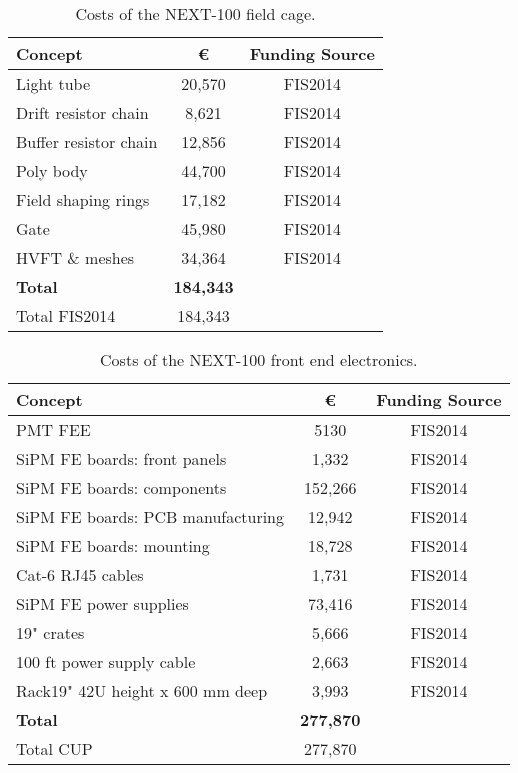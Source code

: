 \begin{table}[h!]
\begin{center}
\begin{tabular}{|l|c|c|}
\hline
 Concept & \euro & Funding Source \\
 \hline
 Light tube & 20,570 & FIS2014 \\
 Drift resistor chain & 8,621 & FIS2014 \\
 Buffer resistor chain & 12,856 & FIS2014\\
 Poly body & 44,700 & FIS2014 \\
 Field shaping rings & 17,182 & FIS2014 \\
 Gate &45,980 & FIS2014 \\
 HVFT \& meshes & 34,364 & FIS2014 \\
  \hline
{\bf Total} &	{\bf 184,343}	& \\
  Total FIS2014	&	184,343	& \\
 \hline\hline
\end{tabular}  
\caption{Costs of the NEXT-100 field cage.}
\label{tab.n100:FC}
\end{center}
\end{table} 

\begin{table}[h!]
\begin{center}
\begin{tabular}{|l|c|c|}
\hline
 Concept & \euro & Funding Source \\
 \hline
 PMT FEE & 5130 & FIS2014 \\
 SiPM FE boards: front panels	& 1,332 & FIS2014 \\
SiPM FE boards: components	&	152,266 & FIS2014 \\
SiPM FE boards: PCB manufacturing	&	12,942  & FIS2014 \\
SiPM FE boards:  mounting	&	18,728 & FIS2014 \\
Cat-6 RJ45 cables &	1,731 & FIS2014 \\
SiPM FE power supplies & 73,416 & FIS2014 \\
19" crates  &	5,666 & FIS2014 \\
100 ft power supply cable &	2,663 & FIS2014 \\
Rack19" 42U height x 600 mm deep &	3,993 & FIS2014 \\

  \hline
{\bf Total}	&	{\bf 277,870}	& \\
 Total CUP	&	277,870	& \\
 \hline\hline
\end{tabular}  
\caption{Costs of the NEXT-100 front end electronics.}
\label{tab.n100:FEE}
\end{center}
\end{table} 

